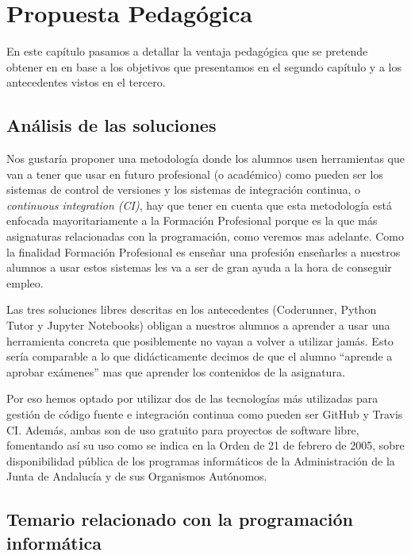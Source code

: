 \chapter{Propuesta Pedagógica}

En este capítulo pasamos a detallar la ventaja pedagógica que se pretende obtener en en base a los objetivos que presentamos en el segundo capítulo y a los antecedentes vistos en el tercero.



\section{Análisis de las soluciones}


Nos gustaría proponer una metodología donde los alumnos usen herramientas que van a tener que usar en futuro profesional (o académico) como pueden ser los sistemas de control de versiones y los sistemas de integración continua, o \textit{continuous integration (CI)}, hay que tener en cuenta que esta metodología está enfocada mayoritariamente a la Formación Profesional porque es la que más asignaturas relacionadas con la programación, como veremos mas adelante. Como la finalidad Formación Profesional es enseñar una profesión enseñarles a nuestros alumnos a usar estos sistemas les va a ser de gran ayuda a la hora de conseguir empleo.

\bigskip
Las tres soluciones libres descritas en los antecedentes (Coderunner, Python Tutor y Jupyter Notebooks) obligan a nuestros alumnos a aprender a usar una herramienta concreta que posiblemente no vayan a volver a utilizar jamás. Esto sería comparable a lo que didácticamente decimos de que el alumno ``aprende a aprobar exámenes'' mas que aprender los contenidos de la asignatura.

\bigskip
Por eso hemos optado por utilizar dos de las tecnologías más utilizadas para gestión de código fuente e integración continua como pueden ser GitHub y Travis CI. Además, ambas son de uso gratuito para proyectos de software libre, fomentando así su uso como se indica en la Orden de 21 de febrero de 2005, sobre disponibilidad pública de los programas informáticos de la Administración de la Junta de Andalucía y de sus Organismos Autónomos.

\section {Temario relacionado con la programación informática}


